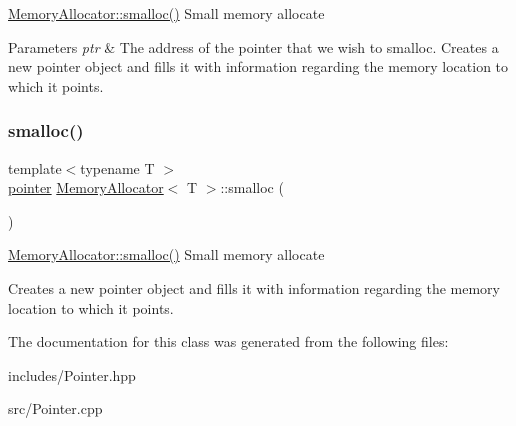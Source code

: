 \hyperlink{class_memory_allocator_a8712abdd481153bf70734258bfc3f8b9}{Memory\+Allocator\+::smalloc()} Small memory allocate


\begin{DoxyParams}{Parameters}
{\em ptr} & The address of the pointer that we wish to smalloc. Creates a new pointer object and fills it with information regarding the memory location to which it points. \\
\hline
\end{DoxyParams}
\mbox{\label{class_memory_allocator_a8712abdd481153bf70734258bfc3f8b9}} 
\subsubsection{\texorpdfstring{smalloc()}{smalloc()}\hspace{0.1cm}{\footnotesize\ttfamily [2/2]}}
{\footnotesize\ttfamily template$<$typename T $>$ \\
\hyperlink{structpointer}{pointer} \hyperlink{class_memory_allocator}{Memory\+Allocator}$<$ T $>$\+::smalloc (\begin{DoxyParamCaption}{ }\end{DoxyParamCaption})}

\hyperlink{class_memory_allocator_a8712abdd481153bf70734258bfc3f8b9}{Memory\+Allocator\+::smalloc()} Small memory allocate

Creates a new pointer object and fills it with information regarding the memory location to which it points. 

The documentation for this class was generated from the following files\+:\begin{DoxyCompactItemize}
\item 
includes/Pointer.\+hpp\item 
src/Pointer.\+cpp\end{DoxyCompactItemize}
